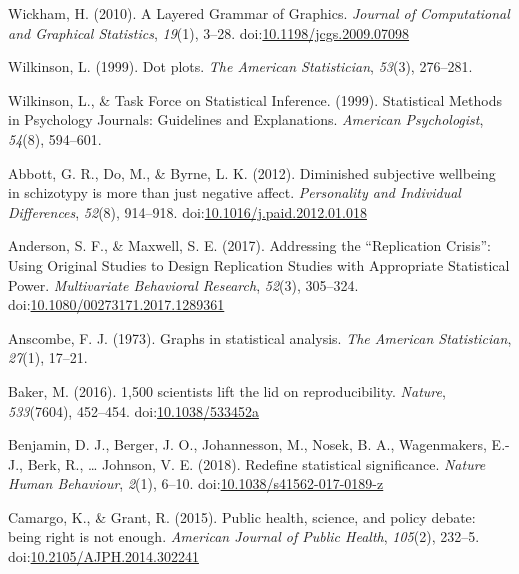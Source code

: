 \documentclass[
  man]{apa6}
\begin{document}
\leavevmode\hypertarget{ref-Wickham2010}{}%
Wickham, H. (2010). A Layered Grammar of Graphics. \emph{Journal of Computational and Graphical Statistics}, \emph{19}(1), 3--28. doi:\href{https://doi.org/10.1198/jcgs.2009.07098}{10.1198/jcgs.2009.07098}

\leavevmode\hypertarget{ref-Wilkinson1999}{}%
Wilkinson, L. (1999). Dot plots. \emph{The American Statistician}, \emph{53}(3), 276--281.

\leavevmode\hypertarget{ref-Wilkinson1999a}{}%
Wilkinson, L., \& Task Force on Statistical Inference. (1999). Statistical Methods in Psychology Journals: Guidelines and Explanations. \emph{American Psychologist}, \emph{54}(8), 594--601.

\leavevmode\hypertarget{ref-Abbott2012}{}%
Abbott, G. R., Do, M., \& Byrne, L. K. (2012). Diminished subjective wellbeing in schizotypy is more than just negative affect. \emph{Personality and Individual Differences}, \emph{52}(8), 914--918. doi:\href{https://doi.org/10.1016/j.paid.2012.01.018}{10.1016/j.paid.2012.01.018}

\leavevmode\hypertarget{ref-Anderson2017}{}%
Anderson, S. F., \& Maxwell, S. E. (2017). Addressing the ``Replication Crisis'': Using Original Studies to Design Replication Studies with Appropriate Statistical Power. \emph{Multivariate Behavioral Research}, \emph{52}(3), 305--324. doi:\href{https://doi.org/10.1080/00273171.2017.1289361}{10.1080/00273171.2017.1289361}

\leavevmode\hypertarget{ref-anscombe1973graphs}{}%
Anscombe, F. J. (1973). Graphs in statistical analysis. \emph{The American Statistician}, \emph{27}(1), 17--21.

\leavevmode\hypertarget{ref-Baker2016a}{}%
Baker, M. (2016). 1,500 scientists lift the lid on reproducibility. \emph{Nature}, \emph{533}(7604), 452--454. doi:\href{https://doi.org/10.1038/533452a}{10.1038/533452a}

\leavevmode\hypertarget{ref-Benjamin2018}{}%
Benjamin, D. J., Berger, J. O., Johannesson, M., Nosek, B. A., Wagenmakers, E.-J., Berk, R., \ldots{} Johnson, V. E. (2018). Redefine statistical significance. \emph{Nature Human Behaviour}, \emph{2}(1), 6--10. doi:\href{https://doi.org/10.1038/s41562-017-0189-z}{10.1038/s41562-017-0189-z}

\leavevmode\hypertarget{ref-Camargo2015}{}%
Camargo, K., \& Grant, R. (2015). Public health, science, and policy debate: being right is not enough. \emph{American Journal of Public Health}, \emph{105}(2), 232--5. doi:\href{https://doi.org/10.2105/AJPH.2014.302241}{10.2105/AJPH.2014.302241}
\end{document}
